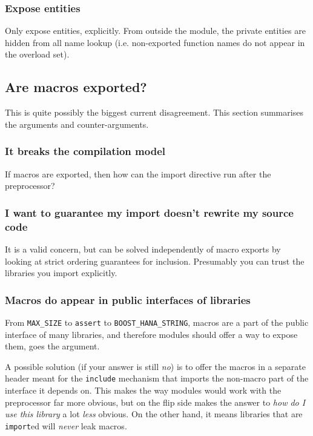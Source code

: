\documentclass[reqno]{article}
\begin{document}
\subsubsection{Expose entities}

Only expose entities, explicitly. From outside the module, the private entities
are hidden from all name lookup (i.e. non-exported function names do not appear
in the overload set).


\subsection{Are macros exported?}

This is quite possibly the biggest current disagreement. This section summarises
the arguments and counter-arguments.


\subsubsection{It breaks the compilation model}

If macros are exported, then how can the import directive run after the
preprocessor?

\subsubsection{I want to guarantee my import doesn't rewrite my source code}

It is a valid concern, but can be solved independently of macro exports by
looking at strict ordering guarantees for inclusion. Presumably you can trust
the libraries you import explicitly.

\subsubsection{Macros do appear in public interfaces of libraries}

From \texttt{MAX\_SIZE} to \texttt{assert} to \texttt{BOOST\_HANA\_STRING},
macros are a part of the public interface of many libraries, and therefore
modules should offer a way to expose them, goes the argument.

A possible solution (if your answer is still \emph{no}) is to offer the macros
in a separate header meant for the \texttt{include} mechanism that imports the
non-macro part of the interface it depends on. This makes the way modules would
work with the preprocessor far more obvious, but on the flip side makes the
answer to \emph{how do I use this library} a lot \emph{less} obvious.  On the
other hand, it means libraries that are \texttt{import}ed will \emph{never}
leak macros.
\end{document}

